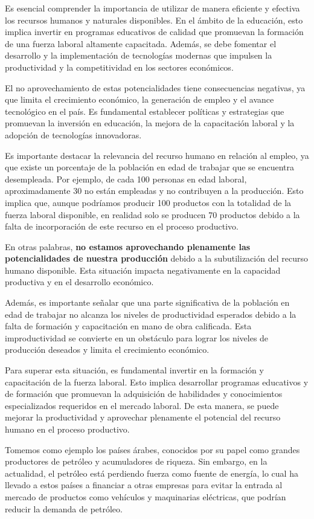 \documentclass[
  a4paper,
]{article}
\begin{document}
Es esencial comprender la importancia de utilizar de manera eficiente y
efectiva los recursos humanos y naturales disponibles. En el ámbito de
la educación, esto implica invertir en programas educativos de calidad
que promuevan la formación de una fuerza laboral altamente capacitada.
Además, se debe fomentar el desarrollo y la implementación de
tecnologías modernas que impulsen la productividad y la competitividad
en los sectores económicos.

El no aprovechamiento de estas potencialidades tiene consecuencias
negativas, ya que limita el crecimiento económico, la generación de
empleo y el avance tecnológico en el país. Es fundamental establecer
políticas y estrategias que promuevan la inversión en educación, la
mejora de la capacitación laboral y la adopción de tecnologías
innovadoras.

Es importante destacar la relevancia del recurso humano en relación al
empleo, ya que existe un porcentaje de la población en edad de trabajar
que se encuentra desempleada. Por ejemplo, de cada 100 personas en edad
laboral, aproximadamente 30 no están empleadas y no contribuyen a la
producción. Esto implica que, aunque podríamos producir 100 productos
con la totalidad de la fuerza laboral disponible, en realidad solo se
producen 70 productos debido a la falta de incorporación de este recurso
en el proceso productivo.

En otras palabras, \textbf{no estamos aprovechando plenamente las
potencialidades de nuestra producción} debido a la subutilización del
recurso humano disponible. Esta situación impacta negativamente en la
capacidad productiva y en el desarrollo económico.

Además, es importante señalar que una parte significativa de la
población en edad de trabajar no alcanza los niveles de productividad
esperados debido a la falta de formación y capacitación en mano de obra
calificada. Esta improductividad se convierte en un obstáculo para
lograr los niveles de producción deseados y limita el crecimiento
económico.

Para superar esta situación, es fundamental invertir en la formación y
capacitación de la fuerza laboral. Esto implica desarrollar programas
educativos y de formación que promuevan la adquisición de habilidades y
conocimientos especializados requeridos en el mercado laboral. De esta
manera, se puede mejorar la productividad y aprovechar plenamente el
potencial del recurso humano en el proceso productivo.

Tomemos como ejemplo los países árabes, conocidos por su papel como
grandes productores de petróleo y acumuladores de riqueza. Sin embargo,
en la actualidad, el petróleo está perdiendo fuerza como fuente de
energía, lo cual ha llevado a estos países a financiar a otras empresas
para evitar la entrada al mercado de productos como vehículos y
maquinarias eléctricas, que podrían reducir la demanda de petróleo.
\end{document}
